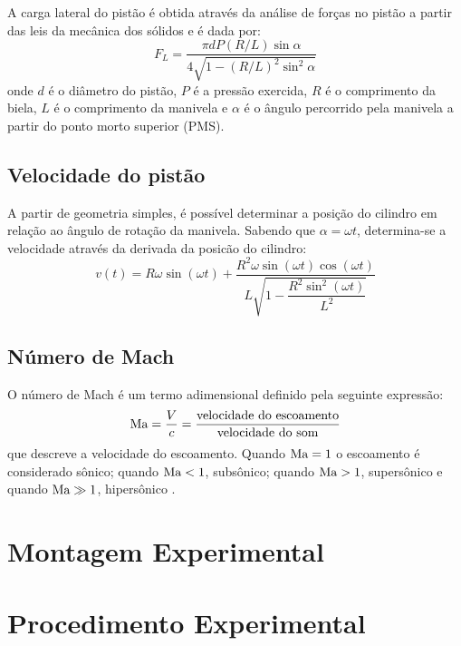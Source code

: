 A carga lateral do pistão é obtida através da análise de forças no pistão a partir das leis da mecânica dos sólidos e é dada por:
%
\begin{equation}
    F_L = \frac{\pi d P (R/L) \sin\alpha}{4\sqrt{1-(R/L)^2\sin^2\alpha}}
    \label{eq:carga_lateral}
\end{equation}
%
onde $d$ é o diâmetro do pistão, $P$ é a pressão exercida, $R$ é o comprimento da biela, $L$ é o comprimento da manivela e $\alpha$ é o ângulo percorrido pela manivela a partir do ponto morto superior (PMS).

\subsection{Velocidade do pistão}

A partir de geometria simples, é possível determinar a posição do cilindro em relação ao ângulo de rotação da manivela. Sabendo que $\alpha=\omega t$, determina-se a velocidade através da derivada da posicão do cilindro:
%
\begin{equation}
    v(t) = R \omega \sin{\left(\omega t \right)} + \frac{R^{2} \omega \sin{\left(\omega t \right)} \cos{\left(\omega t \right)}}{L \sqrt{1 - \dfrac{R^{2} \sin^{2}{\left(\omega t \right)}}{L^{2}}}}
    \label{eq:velocidade}
\end{equation}

\subsection{Número de Mach}

O número de Mach é um termo adimensional definido pela seguinte expressão:
%
\begin{equation}
    \text{Ma} = \frac{V}{c} = \frac{\text{velocidade do escoamento}}{\text{velocidade do som}}
    \label{eq:mach}
\end{equation}
%
que descreve a velocidade do escoamento. Quando $\text{Ma} = 1$ o escoamento é considerado sônico; quando $\text{Ma} < 1$, subsônico; quando $\text{Ma} > 1$, supersônico e quando $\text{Ma} \gg 1$, hipersônico \cite{cengel2015mecanica}.
\section{Montagem Experimental}

\section{Procedimento Experimental}
